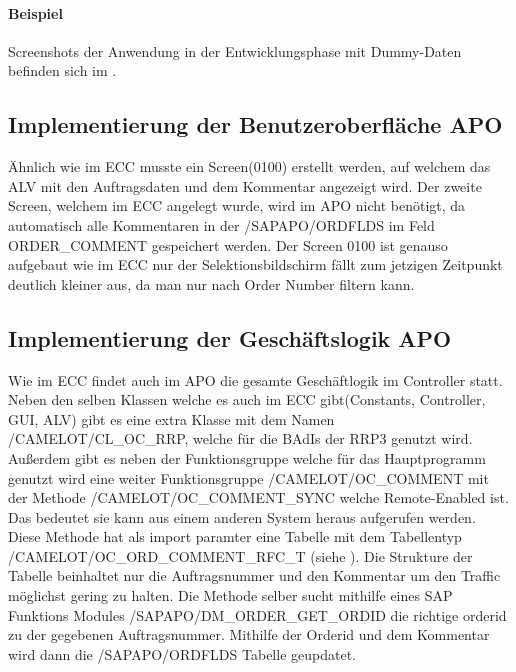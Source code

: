 \paragraph{Beispiel}
Screenshots der Anwendung in der Entwicklungsphase mit Dummy-Daten befinden sich im .

\subsection{Implementierung der Benutzeroberfläche APO}
\label{sec:Implementierung der Benutzeroberfläche APO} 
Ähnlich wie im \ac*{ECC} musste ein Screen(0100) erstellt werden, auf welchem das \ac*{ALV} mit den Auftragsdaten und dem Kommentar angezeigt wird. Der zweite Screen, welchem im ECC angelegt wurde, wird im \ac*{APO} nicht benötigt, da automatisch alle Kommentaren in der /SAPAPO/ORDFLDS im Feld ORDER\_COMMENT gespeichert werden. Der Screen 0100 ist genauso aufgebaut wie im \ac*{ECC} nur der Selektionsbildschirm fällt zum jetzigen Zeitpunkt deutlich kleiner aus, da man nur nach Order Number filtern kann.  

\subsection{Implementierung der Geschäftslogik APO}
\label{sec:Implementierung der Geschäftslogik APO}  
Wie im ECC findet auch im APO die gesamte Geschäftlogik im Controller statt. Neben den selben Klassen welche es auch im ECC gibt(Constants, Controller, GUI, ALV) gibt es eine extra Klasse mit dem Namen /CAMELOT/CL\_OC\_RRP, welche für die \ac*{BAdI}s der RRP3 genutzt wird. Außerdem gibt es neben der Funktionsgruppe welche für das Hauptprogramm genutzt wird eine weiter Funktionsgruppe /CAMELOT/OC\_COMMENT mit der Methode /CAMELOT/OC\_COMMENT\_SYNC welche Remote-Enabled ist. Das bedeutet sie kann aus einem anderen System heraus aufgerufen werden. Diese Methode hat als import paramter eine Tabelle mit dem Tabellentyp /CAMELOT/OC\_ORD\_COMMENT\_RFC\_T (siehe ). Die Strukture der Tabelle beinhaltet nur die Auftragsnummer und den Kommentar um den Traffic möglichst gering zu halten. Die Methode selber sucht mithilfe eines SAP Funktions Modules /SAPAPO/DM\_ORDER\_GET\_ORDID die richtige orderid zu der gegebenen Auftragsnummer. Mithilfe der Orderid und dem Kommentar wird dann die /SAPAPO/ORDFLDS Tabelle geupdatet.  

